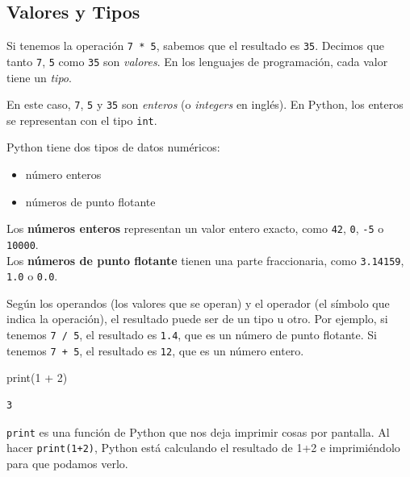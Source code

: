 \documentclass[
  letterpaper,
  DIV=11,
  numbers=noendperiod]{scrreprt}
\newenvironment{Shaded}{\begin{snugshade}}{\end{snugshade}}
\newcommand{\BuiltInTok}[1]{\textcolor[rgb]{0.00,0.23,0.31}{#1}}
\newcommand{\DecValTok}[1]{\textcolor[rgb]{0.68,0.00,0.00}{#1}}
\newcommand{\NormalTok}[1]{\textcolor[rgb]{0.00,0.23,0.31}{#1}}
\newcommand{\OperatorTok}[1]{\textcolor[rgb]{0.37,0.37,0.37}{#1}}
\providecommand{\tightlist}{%
  \setlength{\itemsep}{0pt}\setlength{\parskip}{0pt}}\usepackage{longtable,booktabs,array}
\begin{document}
\subsection{Valores y Tipos}\label{valores-y-tipos}

Si tenemos la operación \texttt{7\ *\ 5}, sabemos que el resultado es
\texttt{35}. Decimos que tanto \texttt{7}, \texttt{5} como \texttt{35}
son \emph{valores}. En los lenguajes de programación, cada valor tiene
un \emph{tipo}.

En este caso, \texttt{7}, \texttt{5} y \texttt{35} son \emph{enteros} (o
\emph{integers} en inglés). En Python, los enteros se representan con el
tipo \texttt{int}.

Python tiene dos tipos de datos numéricos:

\begin{itemize}
\tightlist
\item
  número enteros
\item
  números de punto flotante
\end{itemize}

Los \textbf{números enteros} representan un valor entero exacto, como
\texttt{42}, \texttt{0}, \texttt{-5} o \texttt{10000}.\\
Los \textbf{números de punto flotante} tienen una parte fraccionaria,
como \texttt{3.14159}, \texttt{1.0} o \texttt{0.0}.

Según los operandos (los valores que se operan) y el operador (el
símbolo que indica la operación), el resultado puede ser de un tipo u
otro. Por ejemplo, si tenemos \texttt{7\ /\ 5}, el resultado es
\texttt{1.4}, que es un número de punto flotante. Si tenemos
\texttt{7\ +\ 5}, el resultado es \texttt{12}, que es un número entero.

\begin{Shaded}
\begin{Highlighting}[]
\BuiltInTok{print}\NormalTok{(}\DecValTok{1} \OperatorTok{+} \DecValTok{2}\NormalTok{)}
\end{Highlighting}
\end{Shaded}

\begin{verbatim}
3
\end{verbatim}

\begin{tcolorbox}[enhanced jigsaw, opacitybacktitle=0.6, toptitle=1mm, toprule=.15mm, arc=.35mm, breakable, bottomrule=.15mm, opacityback=0, leftrule=.75mm, rightrule=.15mm, title=\textcolor{quarto-callout-note-color}{\faInfo}\hspace{0.5em}{Note}, left=2mm, bottomtitle=1mm, colframe=quarto-callout-note-color-frame, colback=white, titlerule=0mm, coltitle=black, colbacktitle=quarto-callout-note-color!10!white]

\texttt{print} es una función de Python que nos deja imprimir cosas por
pantalla. Al hacer \texttt{print(1+2)}, Python está calculando el
resultado de 1+2 e imprimiéndolo para que podamos verlo.

\end{tcolorbox}
\end{document}
